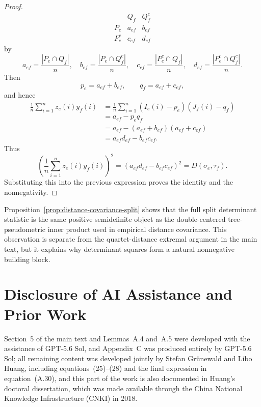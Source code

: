 \documentclass[11pt]{article}
\begin{document}
\begin{proof}
\[\begin{array}{c|cc}
&Q_f&Q_f^c\\
\hline
P_e&a_{ef}&b_{ef}\\
P_e^c&c_{ef}&d_{ef}
\end{array}
\]
by
\[
a_{ef}=\frac{|P_e\cap Q_f|}{n},\quad
b_{ef}=\frac{|P_e\cap Q_f^c|}{n},\quad
c_{ef}=\frac{|P_e^c\cap Q_f|}{n},\quad
d_{ef}=\frac{|P_e^c\cap Q_f^c|}{n}.
\]
Then
\[
p_e=a_{ef}+b_{ef},\qquad q_f=a_{ef}+c_{ef},
\]
and hence
\[
\begin{aligned}
\frac1n\sum_{i=1}^nz_e(i)y_f(i)
&=\frac1n\sum_{i=1}^n(I_e(i)-p_e)(J_f(i)-q_f)\\
&=a_{ef}-p_eq_f\\
&=a_{ef}-(a_{ef}+b_{ef})(a_{ef}+c_{ef})\\
&=a_{ef}d_{ef}-b_{ef}c_{ef}.
\end{aligned}
\]
Thus
\[
\left(\frac1n\sum_{i=1}^nz_e(i)y_f(i)\right)^2
=(a_{ef}d_{ef}-b_{ef}c_{ef})^2
=D(\sigma_e,\tau_f).
\]
Substituting this into the previous expression proves the identity and the nonnegativity.
\end{proof}

Proposition~\ref{prop:distance-covariance-split} shows that the full split determinant statistic is the same positive semidefinite object as the double-centered tree-pseudometric inner product used in empirical distance covariance.  This observation is separate from the quartet-distance extremal argument in the main text, but it explains why determinant squares form a natural nonnegative building block.




\section*{Disclosure of AI Assistance and Prior Work}

Section~5 of the main text and Lemmas~A.4 and~A.5 were developed with the assistance of GPT-5.6 Sol, and Appendix~C was produced entirely by GPT-5.6 Sol; all remaining content was developed jointly by Stefan Gr\"unewald and Libo Huang, including equations~(25)--(28) and the final expression in equation~(A.30), and this part of the work is also documented in Huang's doctoral dissertation, which was made available through the China National Knowledge Infrastructure (CNKI) in 2018.
\end{document}
